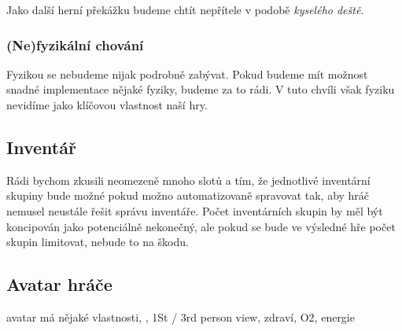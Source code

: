 Jako další herní překážku budeme chtít nepřítele v podobě \textit{kyselého deště}.

\subsubsection{(Ne)fyzikální chování}

Fyzikou se nebudeme nijak podrobně zabývat. Pokud budeme mít možnost snadné implementace nějaké fyziky, budeme za to rádi. V tuto chvíli však fyziku nevidíme jako klíčovou vlastnost naší hry. 

\subsection{Inventář}

Rádi bychom zkusili neomezeně mnoho slotů a tím, že jednotlivé inventární skupiny bude možné pokud možno automatizovaně spravovat tak, aby hráč nemusel neustále řešit správu inventáře. Počet inventárních skupin by měl být koncipován jako potenciálně nekonečný, ale pokud se bude ve výsledné hře počet skupin limitovat, nebude to na škodu.

\subsection{Avatar hráče}
avatar má nějaké vlastnosti, \HUD{}, 1St / 3rd person view, zdraví, O2, energie



